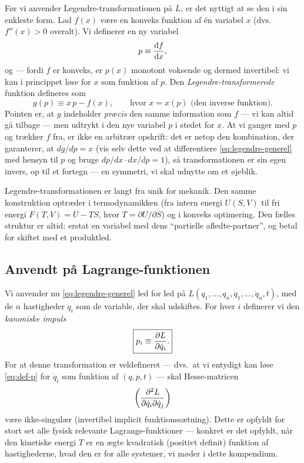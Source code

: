 Før vi anvender Legendre-transformationen på $L$, er det nyttigt at se
den i sin enkleste form. Lad $f(x)$ være en konveks funktion af én
variabel $x$ (dvs.\ $f''(x)>0$ overalt). Vi definerer en ny variabel
\begin{equation}
  p \equiv \dv{f}{x},
\end{equation}
og — fordi $f$ er konveks, er $p(x)$ monotont voksende og dermed
invertibel: vi kan i princippet løse for $x$ som funktion af $p$. Den
\emph{Legendre-transformerede} funktion defineres som
\begin{equation}
  g(p) \equiv x\,p - f(x), \qquad \text{hvor } x = x(p) \text{ (den inverse funktion).}
  \label{eq:legendre-generel}
\end{equation}
Pointen er, at $g$ indeholder \emph{præcis} den samme information som
$f$ — vi kan altid gå tilbage — men udtrykt i den nye variabel $p$ i
stedet for $x$. At vi ganger med $p$ og trækker $f$ fra, er ikke en
arbitrær opskrift: det er netop den kombination, der garanterer, at
$dg/dp = x$ (vis selv dette ved at differentiere
\eqref{eq:legendre-generel} med hensyn til $p$ og bruge
$dp/dx\cdot dx/dp=1$), så transformationen er sin egen invers, op til
et fortegn — en symmetri, vi skal udnytte om et øjeblik.

\begin{bemaerkning}
Legendre-transformationen er langt fra unik for mekanik. Den samme
konstruktion optræder i termodynamikken (fra intern energi $U(S,V)$
til fri energi $F(T,V)=U-TS$, hvor $T=\partial U/\partial S$) og i
konveks optimering. Den fælles struktur er altid: erstat en variabel
med dens ``partielle afledte-partner'', og betal for skiftet med et
produktled.
\end{bemaerkning}

\subsection{Anvendt på Lagrange-funktionen}

Vi anvender nu \eqref{eq:legendre-generel} led for led på
$L(q_1,\dots,q_n,\dot q_1,\dots,\dot q_n,t)$, med de $n$ hastigheder
$\dot q_i$ som de variable, der skal udskiftes. For hver $i$ definerer
vi den \emph{kanoniske impuls}
\begin{equation}
  \boxed{p_i \equiv \pdv{L}{\dot q_i}.}
  \label{eq:def-p}
\end{equation}
For at denne transformation er veldefineret — dvs.\ at vi entydigt kan
løse \eqref{eq:def-p} for $\dot q_i$ som funktion af $(q,p,t)$ — skal
Hesse-matricen
\begin{equation}
  \left(\pdv[2]{L}{\dot q_i}{\dot q_j}\right)
\end{equation}
være ikke-singulær (invertibel implicit funktionssætning). Dette er
opfyldt for stort set alle fysisk relevante Lagrange-funktioner —
konkret er det opfyldt, når den kinetiske energi $T$ er en ægte
kvadratisk (positivt definit) funktion af hastighederne, hvad den er
for alle systemer, vi møder i dette kompendium.

